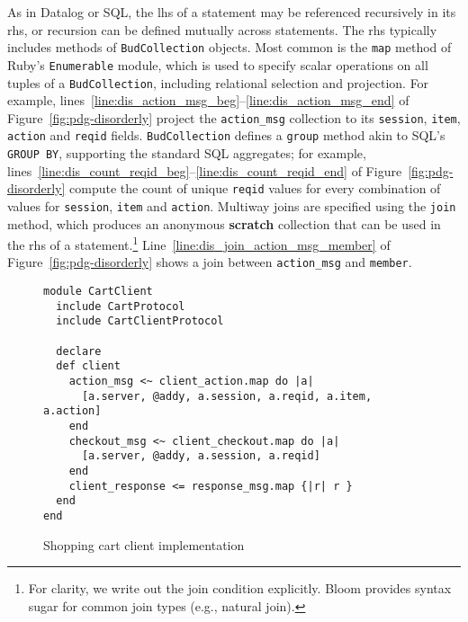 As in Datalog or SQL, the lhs of a statement may be referenced recursively in
its rhs, or recursion can be defined mutually across statements.  The rhs
typically includes methods of \texttt{BudCollection} objects.  Most common is
the \texttt{map} method of Ruby's \texttt{Enumerable} module, which is used to
specify scalar operations on all tuples of a \texttt{BudCollection}, including
relational selection and projection. For example,
lines~\ref{line:dis_action_msg_beg}--\ref{line:dis_action_msg_end} of Figure~\ref{fig:pdg-disorderly} project the
\texttt{action\_msg} collection to its \texttt{session}, \texttt{item},
\texttt{action} and \texttt{reqid} fields.  \texttt{BudCollection} defines a
\texttt{group} method akin to SQL's \texttt{GROUP BY}, supporting the standard
SQL aggregates; for example, lines~\ref{line:dis_count_reqid_beg}--\ref{line:dis_count_reqid_end} of
Figure~\ref{fig:pdg-disorderly} compute the count 
of unique \texttt{reqid} values for every combination of values for
\texttt{session}, \texttt{item} and \texttt{action}.
Multiway joins are specified using the \texttt{join} method, which produces an anonymous \textbf{scratch} collection that can
be used in the rhs of a statement.\footnote{For clarity, we write out the join condition explicitly. Bloom provides syntax sugar for common join types (e.g., natural join).}
Line~\ref{line:dis_join_action_msg_member} of Figure~\ref{fig:pdg-disorderly}
shows a join between \texttt{action\_msg} and \texttt{member}.

\begin{figure}[t]
\begin{scriptsize}
\begin{lstlisting}
module CartClient
  include CartProtocol
  include CartClientProtocol

  declare
  def client
    action_msg <~ client_action.map do |a| 
      [a.server, @addy, a.session, a.reqid, a.item, a.action]
    end
    checkout_msg <~ client_checkout.map do |a| 
      [a.server, @addy, a.session, a.reqid]
    end
    client_response <= response_msg.map {|r| r }
  end
end

\end{lstlisting}
\vspace{-10pt}
\caption{Shopping cart client implementation}
\label{fig:cart_client}
\end{scriptsize}
\vspace{-2pt}
\end{figure}






